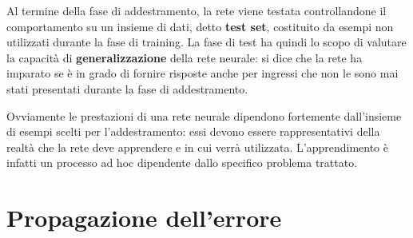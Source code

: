 Al termine della fase di addestramento, la rete viene testata controllandone il comportamento su un insieme di dati, detto \textbf{test set}, costituito da esempi non utilizzati durante la fase di training. La fase di test ha quindi lo scopo di valutare la capacità di \textbf{generalizzazione} della rete neurale: si dice che la rete ha imparato se è in grado di fornire risposte anche per ingressi che non le sono mai stati presentati durante la fase di addestramento.

Ovviamente le prestazioni di una rete neurale dipendono fortemente dall'insieme di esempi scelti per l'addestramento: essi devono essere rappresentativi della realtà che la rete deve apprendere e in cui verrà utilizzata. L'apprendimento è infatti un processo ad hoc dipendente dallo specifico problema trattato.

\section{Propagazione dell'errore}
\label{sec:back_propagation}

